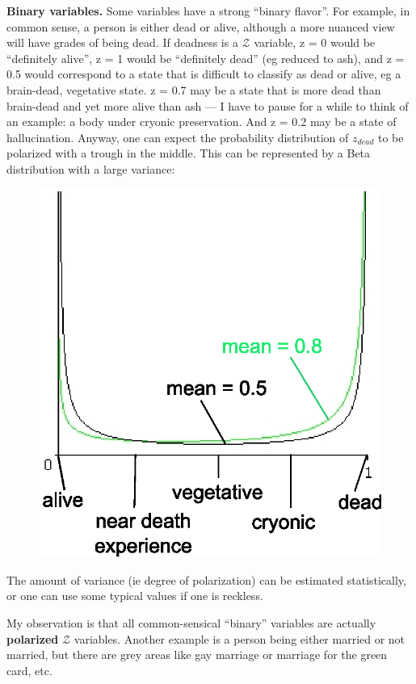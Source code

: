 \textbf{Binary variables.}  Some variables have a strong ``binary flavor''.  For example, in common sense, a person is either dead or alive, although a more nuanced view will have grades of being dead.  If deadness is a $\mathcal{Z}$ variable, z = 0 would be ``definitely alive'', z = 1 would be ``definitely dead'' (eg reduced to ash), and z = 0.5 would correspond to a state that is difficult to classify as dead or alive, eg a brain-dead, vegetative state.  z = 0.7 may be a state that is more dead than brain-dead and yet more alive than ash --- I have to pause for a while to think of an example: a body under cryonic preservation.  And z = 0.2 may be a state of hallucination.  Anyway, one can expect the probability distribution of $z_{dead}$ to be polarized with a trough in the middle.  This can be represented by a Beta distribution with a large variance:
\begin{figure}[H]
\centering
\includegraphics[scale=0.7]{deadness.eps}
\end{figure}
The amount of variance (ie degree of polarization) can be estimated statistically, or one can use some typical values if one is reckless.

My observation is that all common-sensical ``binary'' variables are actually \textbf{polarized} $\mathcal{Z}$ variables.  Another example is a person being either married or not married, but there are grey areas like gay marriage or marriage for the green card, etc.

